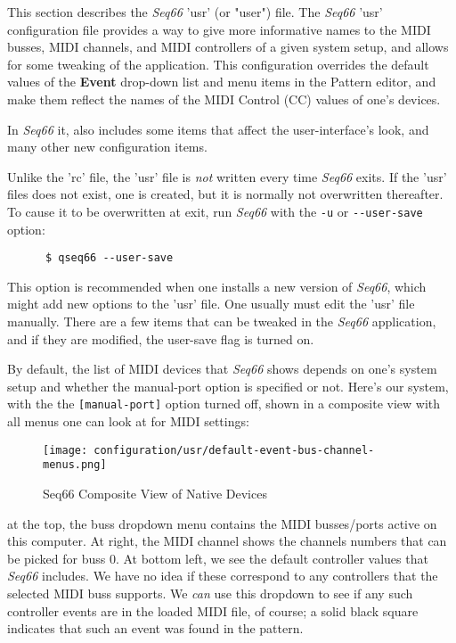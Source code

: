    This section describes the \textsl{Seq66} 'usr' (or "user") file.
   The \textsl{Seq66} 'usr'
   configuration file provides a way to give more
   informative names to the MIDI busses, MIDI channels, and MIDI controllers of
   a given system setup, and allows for some tweaking of the application.
   This configuration overrides the default values
   of the \textbf{Event} drop-down list and menu items in the Pattern editor,
   and make them reflect the names of the MIDI Control (CC) values of one's
   devices.

   In \textsl{Seq66} it, also includes some items that affect the
   user-interface's look, and many other new configuration items.

   Unlike the 'rc' file, the 'usr' file is \textsl{not} written every time
   \textsl{Seq66} exits.  If the 'usr' files does not exist, one is
   created, but it is normally not overwritten thereafter.  To
   cause it to be overwritten at exit, run \textsl{Seq66} with the
   \texttt{-u} or \texttt{-{}-user-save} option:

   \begin{verbatim}
      $ qseq66 --user-save
   \end{verbatim}

   This option is recommended when one installs a new version of
   \textsl{Seq66}, which might add new options to the 'usr' file.
   One usually must edit the 'usr' file manually.
   There are a few items that can be tweaked in the \textsl{Seq66} application,
   and if they are modified, the user-save flag is turned on.

   By default, the list of MIDI devices that \textsl{Seq66} shows depends
   on one's system setup and whether the manual-port option is specified
   or not.  Here's our system, with the
   the \texttt{[manual-port]} option turned off, shown in a
   composite view with all menus one can look at for MIDI settings:

\begin{figure}[H]
   \centering 
   \texttt{[image: configuration/usr/default-event-bus-channel-menus.png]}
   \caption{Seq66 Composite View of Native Devices}
   \label{fig:default_event_bus_channel_menus}
\end{figure}

   at the top, the buss dropdown menu contains the MIDI busses/ports
   active on this computer.  At right, the MIDI channel shows
   the channels numbers that can be picked for buss 0.  At bottom left, we see
   the default controller values that \textsl{Seq66} includes.  We have
   no idea if these correspond to any controllers that the selected MIDI buss
   supports.  We \textsl{can} use this dropdown to see if any such controller
   events are in the loaded MIDI file, of course; a solid black square
   indicates that such an event was found in the pattern.

